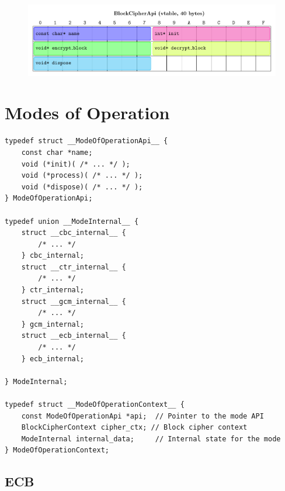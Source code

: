 \documentclass[11pt,a4paper]{report}
\theoremstyle{definitionstyle}
\begin{document}
\begin{figure}[h!]

\end{figure}
\begin{figure}[h!]\centering
	\includegraphics[scale=1]{memory_layout/BlockCipherApi.pdf}
\end{figure}


\newpage


\newpage
\section{Modes of Operation}

\begin{lstlisting}[style=cstyle]
typedef struct __ModeOfOperationApi__ {
	const char *name;
	void (*init)( /* ... */ );
	void (*process)( /* ... */ );
	void (*dispose)( /* ... */ );
} ModeOfOperationApi;

typedef union __ModeInternal__ {
	struct __cbc_internal__ {
		/* ... */
	} cbc_internal;
	struct __ctr_internal__ {
		/* ... */
	} ctr_internal;
	struct __gcm_internal__ {
		/* ... */
	} gcm_internal;
	struct __ecb_internal__ {
		/* ... */
	} ecb_internal;
	
} ModeInternal;

typedef struct __ModeOfOperationContext__ {
	const ModeOfOperationApi *api;  // Pointer to the mode API
	BlockCipherContext cipher_ctx; // Block cipher context
	ModeInternal internal_data;     // Internal state for the mode
} ModeOfOperationContext;
\end{lstlisting}
\begin{figure}[h!]
	
\end{figure}

\newpage
\subsection{ECB}
\end{document}
